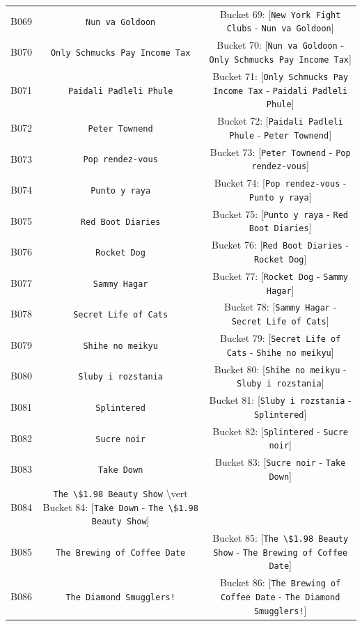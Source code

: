 \documentclass[11pt,a4paper]{article}
\begin{document}
{\begin{xltabular}{\textwidth}{l | C | C}
B069 & \texttt{Nun va Goldoon} & Bucket 69: [\texttt{New York Fight Clubs} - \texttt{Nun va Goldoon}] \\
B070 & \texttt{Only Schmucks Pay Income Tax} & Bucket 70: [\texttt{Nun va Goldoon} - \texttt{Only Schmucks Pay Income Tax}] \\
B071 & \texttt{Paidali Padleli Phule} & Bucket 71: [\texttt{Only Schmucks Pay Income Tax} - \texttt{Paidali Padleli Phule}] \\
B072 & \texttt{Peter Townend} & Bucket 72: [\texttt{Paidali Padleli Phule} - \texttt{Peter Townend}] \\
B073 & \texttt{Pop rendez-vous} & Bucket 73: [\texttt{Peter Townend} - \texttt{Pop rendez-vous}] \\
B074 & \texttt{Punto y raya} & Bucket 74: [\texttt{Pop rendez-vous} - \texttt{Punto y raya}] \\
B075 & \texttt{Red Boot Diaries} & Bucket 75: [\texttt{Punto y raya} - \texttt{Red Boot Diaries}] \\
B076 & \texttt{Rocket Dog} & Bucket 76: [\texttt{Red Boot Diaries} - \texttt{Rocket Dog}] \\
B077 & \texttt{Sammy Hagar} & Bucket 77: [\texttt{Rocket Dog} - \texttt{Sammy Hagar}] \\
B078 & \texttt{Secret Life of Cats} & Bucket 78: [\texttt{Sammy Hagar} - \texttt{Secret Life of Cats}] \\
B079 & \texttt{Shihe no meikyu} & Bucket 79: [\texttt{Secret Life of Cats} - \texttt{Shihe no meikyu}] \\
B080 & \texttt{Sluby i rozstania} & Bucket 80: [\texttt{Shihe no meikyu} - \texttt{Sluby i rozstania}] \\
B081 & \texttt{Splintered} & Bucket 81: [\texttt{Sluby i rozstania} - \texttt{Splintered}] \\
B082 & \texttt{Sucre noir} & Bucket 82: [\texttt{Splintered} - \texttt{Sucre noir}] \\
B083 & \texttt{Take Down} & Bucket 83: [\texttt{Sucre noir} - \texttt{Take Down}] \\
B084 & \texttt{The \textbackslash{}\$1.98 Beauty Show} \textbackslash{}vert  Bucket 84: [\texttt{Take Down} - \texttt{The \textbackslash{}\$1.98 Beauty Show}] &  \\
B085 & \texttt{The Brewing of Coffee Date} & Bucket 85: [\texttt{The \textbackslash{}\$1.98 Beauty Show} - \texttt{The Brewing of Coffee Date}] \\
B086 & \texttt{The Diamond Smugglers!} & Bucket 86: [\texttt{The Brewing of Coffee Date} - \texttt{The Diamond Smugglers!}] \\

\end{xltabular}}
\end{document}
